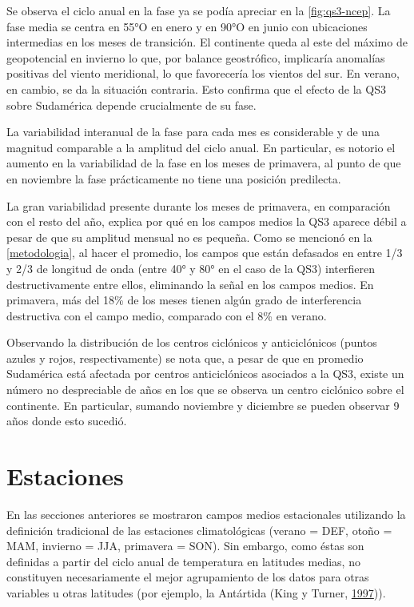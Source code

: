 \documentclass[spanish,a4paper,12pt,oneside]{book}
\begin{document}
Se observa el ciclo anual en la fase ya se podía apreciar en la
\autoref{fig:qs3-ncep}. La fase media se centra en 55°O en enero y en
90°O en junio con ubicaciones intermedias en los meses de transición. El
continente queda al este del máximo de geopotencial en invierno lo que,
por balance geostrófico, implicaría anomalías positivas del viento
meridional, lo que favorecería los vientos del sur. En verano, en
cambio, se da la situación contraria. Esto confirma que el efecto de la
QS3 sobre Sudamérica depende crucialmente de su fase.

La variabilidad interanual de la fase para cada mes es considerable y de
una magnitud comparable a la amplitud del ciclo anual. En particular, es
notorio el aumento en la variabilidad de la fase en los meses de
primavera, al punto de que en noviembre la fase prácticamente no tiene
una posición predilecta.

La gran variabilidad presente durante los meses de primavera, en
comparación con el resto del año, explica por qué en los campos medios
la QS3 aparece débil a pesar de que su amplitud mensual no es pequeña.
Como se mencionó en la \autoref{metodologia}, al hacer el promedio, los
campos que están defasados en entre 1/3 y 2/3 de longitud de onda (entre
40° y 80° en el caso de la QS3) interfieren destructivamente entre
ellos, eliminando la señal en los campos medios. En primavera, más del
18\% de los meses tienen algún grado de interferencia destructiva con el
campo medio, comparado con el 8\% en verano.

Observando la distribución de los centros ciclónicos y anticiclónicos
(puntos azules y rojos, respectivamente) se nota que, a pesar de que en
promedio Sudamérica está afectada por centros anticiclónicos asociados a
la QS3, existe un número no despreciable de años en los que se observa
un centro ciclónico sobre el continente. En particular, sumando
noviembre y diciembre se pueden observar 9 años donde esto sucedió.

\section{Estaciones}\label{estaciones}

En las secciones anteriores se mostraron campos medios estacionales
utilizando la definición tradicional de las estaciones climatológicas
(verano = DEF, otoño = MAM, invierno = JJA, primavera = SON). Sin
embargo, como éstas son definidas a partir del ciclo anual de
temperatura en latitudes medias, no constituyen necesariamente el mejor
agrupamiento de los datos para otras variables u otras latitudes (por
ejemplo, la Antártida (King y Turner,
\protect\hyperlink{ref-King1997}{1997})).
\end{document}
